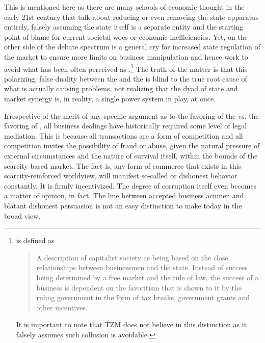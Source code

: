 \documentclass[10pt, a4paper, cleardoubleempty, openright, twoside]{book}
\begin{document}
This is mentioned here as there are many schools of economic thought in
the early 21st century that talk about reducing or even removing the
state apparatus entirely, falsely assuming the state itself is a
separate entity and the starting point of blame for current societal
woes or economic inefficiencies. Yet, on the other side of the debate
spectrum is a general cry for increased state regulation of the market
to ensure more limits on business manipulation and hence work to avoid
what has been often perceived as .\footnote{
	 is defined as
	\blockcquote{Investopedia:http:14}{A description of capitalist
	society as being based on the close relationships between businessmen
	and the state. Instead of success being determined by a free market
	and the rule of law, the success of a business is dependent on the
	favoritism that is shown to it by the ruling government in the form of
	tax breaks, government grants and other incentives.}
	It is important to note that TZM does not believe in this distinction
	as it falsely assumes such collusion is avoidable.
}
The truth of the matter is that this polarizing, false duality between
the  and the  is blind to the true
root cause of what is actually causing problems, not realizing that the
dyad of state and market synergy is, in reality, a single power system
in play, at once.

Irrespective of the merit of any specific argument as to the favoring of
the  vs. the favoring of , all business dealings have historically required some level
of legal mediation. This is because all transactions are a form of
competition and all competition invites the possibility of fraud or
abuse, given the natural pressure of external circumstances and the
nature of survival itself, within the bounds of the scarcity-based
market. The fact is, any form of commerce that exists in this
scarcity-reinforced worldview, will manifest so-called
 or dishonest behavior constantly. It is firmly
incentivized. The degree of corruption itself even becomes a matter of
opinion, in fact. The line between accepted business acumen and blatant
dishonest persuasion is not an easy distinction to make today in the
broad view.
\end{document}
